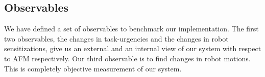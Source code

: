 \documentclass{llncs}
\begin{document}
\subsection{Observables}
We have defined a set of observables to benchmark our implementation. The first two observables, the changes in task-urgencies and the changes in robot sensitizations, give us an external and an internal view of our system with respect to AFM respectively. Our third observable is to find changes in robot motions. This is completely objective measurement of our system.%
%
% 
\end{document}
